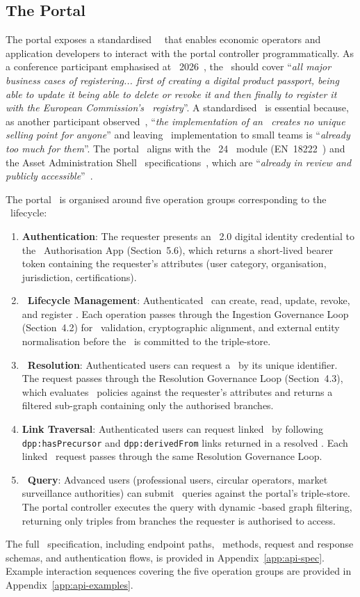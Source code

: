 \subsection{The Portal \API}

The portal exposes a standardised \REST\ \API\ that enables economic operators
and application developers to interact with the portal controller
programmatically. As a conference participant emphasised at
\DPPforEU~2026~\cite{dpp4eu2026_day1}, the \API\ should cover ``\textit{all
major business cases of registering... first of creating a digital product
passport, being able to update it being able to delete or revoke it and then
finally to register it with the European Commission's \DPP\ registry}''. A
standardised \API\ is essential because, as another participant
observed~\cite{dpp4eu2026_day1}, ``\textit{the implementation of an \API\
creates no unique selling point for anyone}'' and leaving \API\ implementation
to small teams is ``\textit{already too much for them}''. The portal \API\
aligns with the \JTC~24 \API\ module (EN~18222~\cite{en18222}) and the Asset
Administration Shell \API\ specifications~\cite{dpp4eu2026_day1}, which are
``\textit{already in review and publicly accessible}''~\cite{dpp4eu2026_day2}.

The portal \API\ is organised around five operation groups corresponding to the
\DPP\ lifecycle:

\begin{enumerate}
\item \textbf{Authentication}: The requester presents an \eIDAS~2.0 digital
identity credential to the \EC\ Authorisation App (Section~5.6), which returns a
short-lived bearer token containing the requester's attributes (user category,
organisation, jurisdiction, certifications).
\item \textbf{\DPP\ Lifecycle Management}: Authenticated \REOs\ can create,
read, update, revoke, and register \DPPs. Each operation passes through the
Ingestion Governance Loop (Section~4.2) for \SHACL\ validation, cryptographic
alignment, and external entity normalisation before the \DPP\ is committed to
the triple-store.
\item \textbf{\DPP\ Resolution}: Authenticated users can request a \DPP\ by its
unique identifier. The request passes through the Resolution Governance Loop
(Section~4.3), which evaluates \ODRL\ policies against the requester's
attributes and returns a filtered sub-graph containing only the authorised
branches.
\item \textbf{Link Traversal}: Authenticated users can request linked \DPPs\ by
following \texttt{dpp:hasPrecursor} and \texttt{dpp:derivedFrom} links returned
in a resolved \DPP. Each linked \DPP\ request passes through the same Resolution
Governance Loop.
\item \textbf{\SPARQL\ Query}: Advanced users (professional users, circular
operators, market surveillance authorities) can submit \SPARQL\ queries against
the portal's triple-store. The portal controller executes the query with dynamic
\ODRL-based graph filtering, returning only triples from branches the requester
is authorised to access.
\end{enumerate}

The full \API\ specification, including endpoint paths, \HTTP\ methods, request
and response schemas, and authentication flows, is provided in
Appendix~\ref{app:api-spec}. Example interaction sequences covering the five
operation groups are provided in Appendix~\ref{app:api-examples}.
